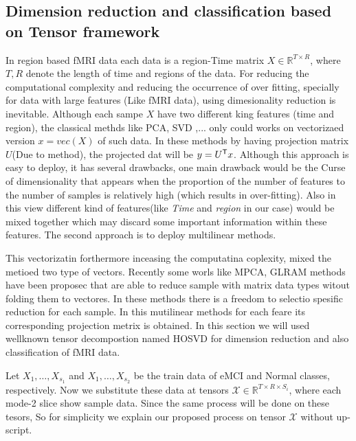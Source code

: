 \documentclass[journal]{IEEEtran}
\begin{document}
\subsection{ Dimension reduction and classification based on Tensor framework}
In region based fMRI data  each data is a region-Time matrix $X\in \mathbb{R}^{T\times R}$, where $T, R$ denote the length of time and regions of the data. For reducing the computational complexity and reducing the  occurrence of over fitting, specially for data with large features (Like fMRI data), using  dimesionality reduction is inevitable. Although each sampe $X$ have two different king features (time and region), the classical methds like PCA, SVD ,... only could works on vectorizaed version $x=vec(X)$ of such data. In these methods by having projection matrix $U$(Due to method), the projected dat will be $y=U^{\sf T}x$.
Although this approach is easy to deploy, it has several drawbacks, one main drawback would be the Curse of dimensionality that appears when the proportion of the number of features to the number of samples is relatively high (which results in over-fitting). 
Also in this view different kind of features(like \emph{Time} and \emph{region} in our case) would be mixed together which may discard some important information within these features. The second approach is to deploy multilinear methods. 

This vectorizatin forthermore inceasing the computatina coplexity, mixed the metioed two type of vectors. Recently some worls like MPCA, GLRAM methods have been proposec that are able to reduce sample with matrix data types witout folding them to vectores. In these methods there is a freedom to selectio spesific reduction for each sample. In this mutilinear methods  for each feare its corresponding projection metrix is obtained. In this section we will used wellknown tensor decompostion named HOSVD for dimension reduction and also classification of fMRI data.

Let ${X_1,\ldots,X_{s_1}}$ and  ${X_1,\ldots,X_{s_2}}$ be the train data of eMCI and Normal classes, respectively. Now we substitute these data at tensors $\mathcal{X}\in \mathbb{R}^{T\times R \times S_i}$, where  each mode-2 slice show 
sample data. Since the same process will be done on these tesors, So for simplicity we explain our proposed process on tensor $\mathcal{X}$ without up-script. 
\end{document}
